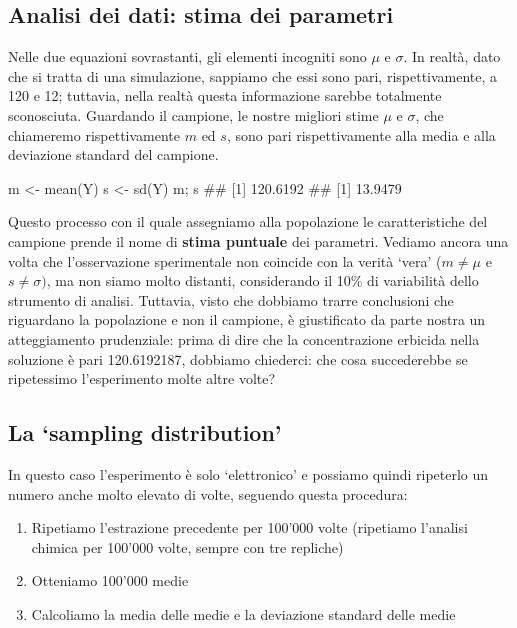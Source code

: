 \documentclass[a4paper,12pt,oneside]{book}
\providecommand{\tightlist}{%
  \setlength{\itemsep}{0pt}\setlength{\parskip}{0pt}}
\newenvironment{Shaded}{}{}
\newcommand{\KeywordTok}[1]{#1}
\newcommand{\StringTok}[1]{#1}
\newcommand{\CommentTok}[1]{#1}
\newcommand{\NormalTok}[1]{#1}
\begin{document}
\hypertarget{analisi-dei-dati-stima-dei-parametri}{%
\subsection{Analisi dei dati: stima dei parametri}\label{analisi-dei-dati-stima-dei-parametri}}

Nelle due equazioni sovrastanti, gli elementi incogniti sono \(\mu\) e \(\sigma\). In realtà, dato che si tratta di una simulazione, sappiamo che essi sono pari, rispettivamente, a 120 e 12; tuttavia, nella realtà questa informazione sarebbe totalmente sconosciuta. Guardando il campione, le nostre migliori stime \(\mu\) e \(\sigma\), che chiameremo rispettivamente \(m\) ed \(s\), sono pari rispettivamente alla media e alla deviazione standard del campione.

\begin{Shaded}
\begin{Highlighting}[]
\NormalTok{m <-}\StringTok{ }\KeywordTok{mean}\NormalTok{(Y)}
\NormalTok{s <-}\StringTok{ }\KeywordTok{sd}\NormalTok{(Y)}
\NormalTok{m; s}
\CommentTok{## [1] 120.6192}
\CommentTok{## [1] 13.9479}
\end{Highlighting}
\end{Shaded}

Questo processo con il quale assegniamo alla popolazione le caratteristiche del campione prende il nome di \textbf{stima puntuale} dei parametri. Vediamo ancora una volta che l'osservazione sperimentale non coincide con la verità `vera' (\(m \ne \mu\) e \(s \ne \sigma)\), ma non siamo molto distanti, considerando il 10\% di variabilità dello strumento di analisi. Tuttavia, visto che dobbiamo trarre conclusioni che riguardano la popolazione e non il campione, è giustificato da parte nostra un atteggiamento prudenziale: prima di dire che la concentrazione erbicida nella soluzione è pari 120.6192187, dobbiamo chiederci: che cosa succederebbe se ripetessimo l'esperimento molte altre volte?

\hypertarget{la-sampling-distribution}{%
\subsection{La `sampling distribution'}\label{la-sampling-distribution}}

In questo caso l'esperimento è solo `elettronico' e possiamo quindi ripeterlo un numero anche molto elevato di volte, seguendo questa procedura:

\begin{enumerate}
\def\labelenumi{\arabic{enumi}.}
\tightlist
\item
  Ripetiamo l'estrazione precedente per 100'000 volte (ripetiamo l'analisi chimica per 100'000 volte, sempre con tre repliche)
\item
  Otteniamo 100'000 medie
\item
  Calcoliamo la media delle medie e la deviazione standard delle medie
\end{enumerate}
\end{document}
